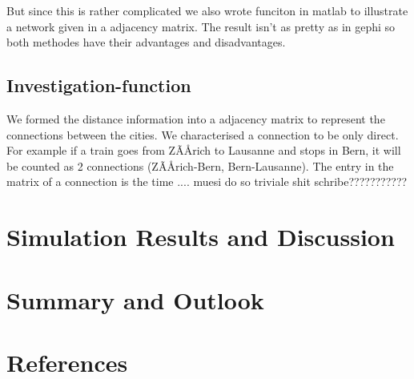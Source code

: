 \documentclass[11pt]{article}
\begin{document}
But since this is rather complicated we also wrote funciton in matlab to illustrate a network given in a adjacency matrix. The result isn't as pretty as in gephi so both methodes have their advantages and disadvantages.

\subsection{Investigation-function}




We formed the distance information into a adjacency matrix to represent the connections between the cities.  We characterised a connection to be only direct. For example if a train goes from ZÃÅrich to Lausanne and stops in Bern, it will be counted as 2 connections (ZÃÅrich-Bern, Bern-Lausanne). The entry in the matrix of a connection is the time .... muesi do so triviale shit schribe???????????




\section{Simulation Results and Discussion}

\section{Summary and Outlook}

\section{References}
\end{document}
